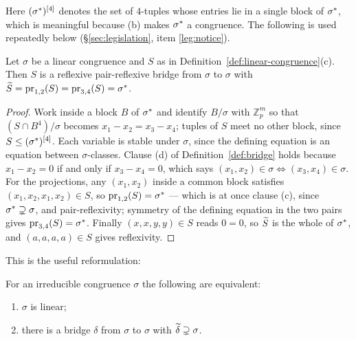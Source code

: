 Here $(\sigma^{*})^{[4]}$ denotes the set of $4$-tuples whose entries lie in
a single block of $\sigma^{*}$, which is meaningful because (b) makes
$\sigma^{*}$ a congruence. The following is used repeatedly below
(\S\ref{sec:legislation}, item \ref{leg:notice}).

\begin{lemma}\label{lem:linear-bridge}
Let $\sigma$ be a linear congruence and $S$ as in
Definition~\ref{def:linear-congruence}(c). Then $S$ is a reflexive
pair-reflexive bridge from $\sigma$ to $\sigma$ with
$\widetilde{S}=\operatorname*{pr}_{1,2}(S)=\operatorname*{pr}_{3,4}(S)=\sigma^{*}$.
\end{lemma}

\begin{proof}
Work inside a block $B$ of $\sigma^{*}$ and identify $B/\sigma$ with
$\mathbb Z_{p}^{m}$ so that $(S\cap B^{4})/\sigma$ becomes
$x_{1}-x_{2}=x_{3}-x_{4}$; tuples of $S$ meet no other block, since
$S\le(\sigma^{*})^{[4]}$. Each variable is
stable under $\sigma$, since the defining equation is an equation between
$\sigma$-classes. Clause (d) of Definition~\ref{def:bridge} holds because
$x_{1}-x_{2}=0$ if and only if $x_{3}-x_{4}=0$, which says
$(x_{1},x_{2})\in\sigma\iff(x_{3},x_{4})\in\sigma$. For the projections, any
$(x_{1},x_{2})$ inside a common block satisfies
$(x_{1},x_{2},x_{1},x_{2})\in S$, so $\operatorname*{pr}_{1,2}(S)=\sigma^{*}$ --- which
is at once clause (c), since $\sigma^{*}\supsetneq\sigma$, and
pair-reflexivity; symmetry of the defining equation in the two pairs gives
$\operatorname*{pr}_{3,4}(S)=\sigma^{*}$. Finally $(x,x,y,y)\in S$ reads $0=0$, so
$\widetilde{S}$ is the whole of $\sigma^{*}$, and $(a,a,a,a)\in S$ gives
reflexivity.
\end{proof}

This is the useful reformulation:

\begin{lemma}\label{lem:linear-equiv}
For an irreducible congruence $\sigma$ the following are equivalent:
\begin{enumerate}\alphlabels\tightlist
\item $\sigma$ is linear;
\item there is a bridge $\delta$ from $\sigma$ to $\sigma$ with
  $\widetilde{\delta}\supsetneq\sigma$.
\end{enumerate}
\end{lemma}

